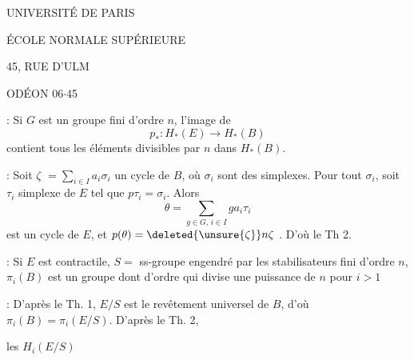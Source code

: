 \begin{center}
UNIVERSITÉ DE PARIS


ÉCOLE NORMALE SUPÉRIEURE


45, RUE D'ULM

ODÉON 06$\cdot$45

\end{center}


 : Si $G$ est un groupe fini d'ordre $n$, l'image de
\[
p_*:H_*(E)\longrightarrow H_*(B)
\]
contient tous les éléments  divisibles par $n$ dans $H_*(B)$.

 : Soit $\zeta$ $=\sum_{i\in I}a_i\sigma_i$ un cycle de $B$, où $\sigma_i$ sont des simplexes.
Pour tout $\sigma_i$, soit $\tau_i$ simplexe de $E$ tel que $p\tau_i=\sigma_i$. Alors
\[
\theta=\sum_{g\in G,\,i\in I}ga_i\tau_i
\]
est un cycle de $E$, et $p(\theta)=\deleted{\unsure{\zeta}}n\zeta$ . D'où le Th 2.

 : Si  $E$ est  contractile, $S=$ ss-groupe engendré par les stabilisateurs fini d'ordre $n$, $\pi_i(B)$ est un groupe  dont  d'ordre qui divise une puissance de $n$ pour $i>1$

 :  D'après le Th. 1, $E/S$ est le revêtement universel de $B$, d'où $\pi_i(B)=\pi_i(E/S)$. D'après le Th. 2,

 les $H_i(E/S)$


